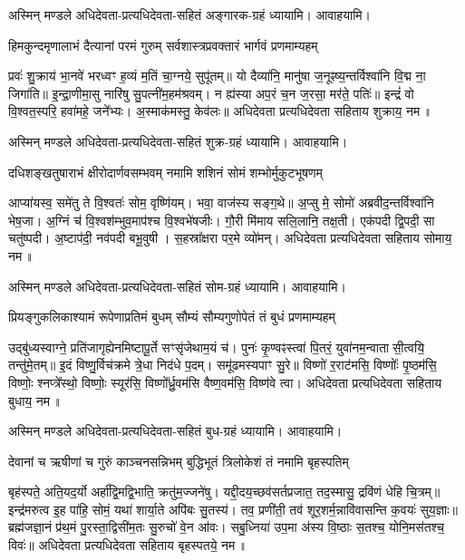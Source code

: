 अस्मिन् मण्डले अधिदेवता-प्रत्यधिदेवता-सहितं अङ्गारक-ग्रहं ध्यायामि। आवाहयामि।


\twolineshloka
{हिमकुन्दमृणालाभं दैत्यानां परमं गुरुम्}
{सर्वशास्त्रप्रवक्तारं भार्गवं प्रणमाम्यहम्}

प्रवः॑ शु॒क्राय॑ भा॒नवे॑ भरध्वꣳ ह॒व्यं म॒तिं चा॒ग्नये॒ सुपू॑तम्॥ यो दैव्या॑नि॒ मानु॑षा
ज॒नूꣴष्य॒न्तर्विश्वा॑नि वि॒द्म ना॒ जिगा॑ति॥ इ॒न्द्रा॒णीमा॒सु नारि॑षु सु॒पत्नी॑म॒हम॑श्रवम्। न
ह्य॑स्या अप॒रं च॒न ज॒रसा॒ मर॑ते॒ पतिः॑॥ इन्द्रं॑ वो वि॒श्वत॒स्परि॒ हवा॑महे॒ जने᳚भ्यः। अ॒स्माक॑मस्तु॒
केव॑लः॥  अधिदेवता प्रत्यधिदेवता सहिताय शुक्राय॒ नम॥ 

अस्मिन् मण्डले अधिदेवता-प्रत्यधिदेवता-सहितं शुक्र-ग्रहं ध्यायामि। आवाहयामि।


\twolineshloka
{दधिशङ्खतुषाराभं क्षीरोदार्णवसम्भवम्}
{नमामि शशिनं सोमं शम्भोर्मुकुटभूषणम्}

आप्या॑यस्व॒ समे॑तु ते वि॒श्वतः॑ सोम॒ वृष्णि॑यम्। भवा॒ वाज॑स्य सङ्ग॒थे॥ अ॒प्सु मे॒ सोमो॑
अब्रवीद॒न्तर्विश्वा॑नि भेष॒जा। अ॒ग्निं च॑ वि॒श्वश॑म्भुव॒माप॑श्च वि॒श्वभे॑षजीः। गौ॒री मि॑माय
सलि॒लानि॒ तक्ष॒ती। एक॑पदी द्वि॒पदी॒ सा चतु॑ष्पदी। अ॒ष्टाप॑दी॒ नव॑पदी बभू॒वुषी। स॒हस्रा᳚क्षरा पर॒मे
व्यो॑मन्।  अधिदेवता प्रत्यधिदेवता सहिताय सोमाय॒ नम॥ 

अस्मिन् मण्डले अधिदेवता-प्रत्यधिदेवता-सहितं सोम-ग्रहं ध्यायामि। आवाहयामि।


\twolineshloka
{प्रियङ्गुकलिकाश्यामं रूपेणाप्रतिमं बुधम्}
{सौम्यं सौम्यगुणोपेतं तं बुधं प्रणमाम्यहम्}

उद्बु॑ध्यस्वाग्ने॒ प्रति॑जागृह्येनमिष्टापू॒र्ते सꣳसृ॑जेथाम॒यं च॑। पुनः॑ कृ॒ण्वꣴस्त्वा॑ पि॒तरं॒
युवा॑नम॒न्वातासी॒त्वयि॒ तन्तु॑मे॒तम्॥ इ॒दं विष्णु॒र्विच॑क्रमे त्रे॒धा निद॑धे प॒दम्। समू॑ढमस्यपाꣳ
सु॒रे॥ विष्णो॑ र॒राट॑मसि॒ विष्णोः᳚ पृ॒ष्ठम॑सि॒ विष्णोः॒ श्नप्त्रे᳚स्थो॒ विष्णोः॒ स्यूर॑सि॒
विष्णो᳚र्ध्रु॒वम॑सि वैष्ण॒वम॑सि॒ विष्ण॑वे त्वा।  अधिदेवता प्रत्यधिदेवता सहिताय बुधाय॒ नम॥ 

अस्मिन् मण्डले अधिदेवता-प्रत्यधिदेवता-सहितं बुध-ग्रहं ध्यायामि। आवाहयामि।


\twolineshloka
{देवानां च ऋषीणां च गुरुं काञ्चनसन्निभम्}
{बुद्धिभूतं त्रिलोकेशं तं नमामि बृहस्पतिम्}

बृह॑स्पते॒ अति॒यद॒र्यो अर्हा᳚द्वि॒मद्वि॒भाति॒ क्रतु॑म॒ज्जने॑षु। यद्दी॒दय॒च्छव॑सर्त\-प्रजात॒
तद॒स्मासु॒ द्रवि॑णं धेहि चि॒त्रम्॥ इन्द्र॑मरुत्व इ॒ह पा॑हि॒ सोमं॒ यथा॑ शार्या॒ते अपि॑बः सु॒तस्य॑।
तव॒ प्रणी॑ती॒ तव॑ शूर॒शर्म॒न्नावि॑वासन्ति क॒वयः॑ सुय॒ज्ञाः॥ ब्रह्म॑जज्ञा॒नं प्र॑थ॒मं
पु॒रस्ता॒द्विसी॑म॒तः सु॒रुचो॑ वे॒न आ॑वः। सबु॒ध्निया॑ उप॒मा अ॑स्य वि॒ष्ठाः स॒तश्च॒ योनि॒मस॑तश्च॒
विवः॑॥ अधिदेवता प्रत्यधिदेवता सहिताय बृहस्पतये॒ नम॥ 

